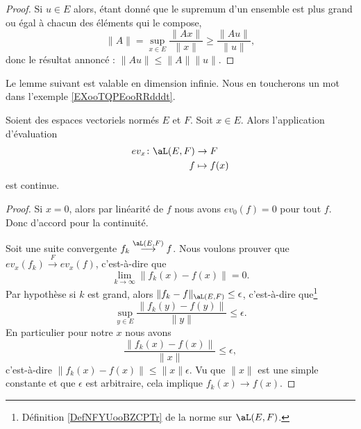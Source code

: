 \begin{proof}
	Si \( u\in E\) alors, étant donné que le supremum d'un ensemble est plus grand ou égal à chacun des éléments qui le compose,
	\begin{equation}
		\| A \|=\sup_{x\in E}\frac{ \| Ax \| }{ \| x \| }\geq \frac{ \| Au \| }{ \| u \| },
	\end{equation}
	donc le résultat annoncé : \( \| Au \|\leq \| A \|\| u \|\).
\end{proof}

Le lemme suivant est valable en dimension infinie. Nous en toucherons un mot dans l'exemple \ref{EXooTQPEooRRdddt}.
\begin{lemma}       \label{LEMooWFNXooLyTyyX}
	Soient des espaces vectoriels normés \( E\) et \( F\). Soit \( x\in E\). Alors l'application d'évaluation
	\begin{equation}
		\begin{aligned}
			ev_x\colon \aL(E,F) & \to F        \\
			f                   & \mapsto f(x)
		\end{aligned}
	\end{equation}
	est continue.
\end{lemma}

\begin{proof}
	Si \( x=0\), alors par linéarité de \( f\) nous avons \( ev_0(f)=0\) pour tout \( f\). Donc d'accord pour la continuité.

	Soit une suite convergente \( f_k\stackrel{\aL(E,F)}{\longrightarrow}f\). Nous voulons prouver que \( ev_x(f_k)\stackrel{F}{\longrightarrow}ev_x(f)\), c'est-à-dire que
	\begin{equation}
		\lim_{k\to \infty} \| f_k(x)-f(x) \|=0.
	\end{equation}
	Par hypothèse si \( k\) est grand, alors \( \| f_k-f  \|_{\aL(E,F)}\leq \epsilon\), c'est-à-dire que\footnote{Définition \ref{DefNFYUooBZCPTr} de la norme sur \( \aL(E,F)\).}
	\begin{equation}
		\sup_{y\in E}\frac{ \| f_k(y)-f(y) \| }{ \| y \| }\leq \epsilon.
	\end{equation}
	En particulier pour notre \( x\) nous avons
	\begin{equation}
		\frac{ \| f_k(x)-f(x) \| }{ \| x \| }\leq \epsilon,
	\end{equation}
	c'est-à-dire \( \| f_k(x)-f(x) \|\leq \| x \|\epsilon\). Vu que \( \| x \|\) est une simple constante et que \( \epsilon\) est arbitraire, cela implique \( f_k(x)\to f(x)\).
\end{proof}


